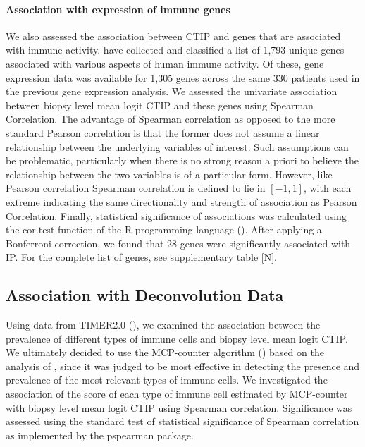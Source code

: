 \documentclass[
]{book}
\begin{document}
\paragraph{\textbf{Association with expression of immune genes}}

We also assessed the association between CTIP and genes that are
associated with immune activity. \citet{Bhattacharya18} have collected and classified a list of 1,793 unique genes associated with various aspects of human immune activity. Of these, gene expression data was available for 1,305 genes across the same 330 patients used in the previous gene expression analysis. We assessed the univariate association between biopsy level mean logit CTIP and these genes using Spearman Correlation. The advantage of Spearman correlation as opposed to the more standard Pearson correlation is that the former does not assume a linear relationship between the underlying variables of interest. Such assumptions can be problematic, particularly when there is no strong reason a priori to believe the relationship between the two variables is of a particular form. However, like Pearson correlation Spearman correlation is defined to lie in \([-1,1]\), with each extreme indicating the same directionality and strength of association as Pearson Correlation. Finally, statistical significance of associations was calculated using the cor.test function of the R programming language (\citet{Rteam}). After applying a Bonferroni correction, we found that 28 genes were significantly associated with IP. For the complete list of genes, see supplementary table {[}N{]}.

\hypertarget{association-with-deconvolution-data}{%
\subsection{Association with Deconvolution Data}\label{association-with-deconvolution-data}}

Using data from TIMER2.0 (\citet{TIMER20}), we examined the association between the prevalence of different types of immune cells and biopsy level mean logit CTIP. We ultimately decided to use the MCP-counter algorithm (\citet{Becht16}) based on the analysis of \citet{Sturm19}, since it was judged to be most effective in detecting the presence and prevalence of the most relevant types of immune cells. We investigated the association of the score of each type of immune cell estimated by MCP-counter with biopsy level mean logit CTIP using Spearman correlation. Significance was assessed using the standard test of statistical significance of Spearman correlation as implemented by the pspearman package.
\end{document}
